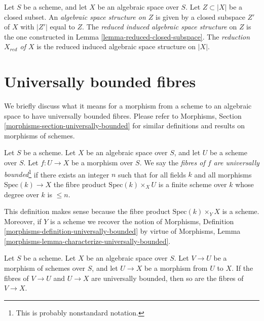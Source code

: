 \begin{definition}
\label{definition-reduced-induced-space}
Let $S$ be a scheme, and let $X$ be an algebraic space over $S$.
Let $Z \subset |X|$ be a closed subset.
An {\it algebraic space structure on $Z$} is given by a closed subspace
$Z'$ of $X$ with $|Z'|$ equal to $Z$.
The {\it reduced induced algebraic space structure}
on $Z$ is the one constructed in
Lemma \ref{lemma-reduced-closed-subspace}.
The {\it reduction $X_{red}$ of $X$} is the reduced induced algebraic
space structure on $|X|$.
\end{definition}






\section{Universally bounded fibres}
\label{section-universally-bounded}

\noindent
We briefly discuss what it means for a morphism from a scheme to an
algebraic space to have universally bounded fibres. Please refer to
Morphisms, Section \ref{morphisms-section-universally-bounded}
for similar definitions and results on morphisms of schemes.

\begin{definition}
\label{definition-universally-bounded}
Let $S$ be a scheme. Let $X$ be an algebraic space over $S$, and
let $U$ be a scheme over $S$. Let $f : U \to X$ be a morphism over $S$.
We say the {\it fibres of $f$ are universally bounded}\footnote{This is
probably nonstandard notation.}
if there exists an integer $n$ such that for all fields
$k$ and all morphisms $\text{Spec}(k) \to X$ the fibre
product $\text{Spec}(k) \times_X U$ is a finite scheme over $k$
whose degree over $k$ is $\leq n$.
\end{definition}

\noindent
This definition makes sense because the fibre product
$\text{Spec}(k) \times_Y X$ is a scheme. Moreover, if $Y$ is a scheme
we recover the notion of
Morphisms, Definition \ref{morphisms-definition-universally-bounded}
by virtue of
Morphisms, Lemma \ref{morphisms-lemma-characterize-universally-bounded}.

\begin{lemma}
\label{lemma-composition-universally-bounded}
Let $S$ be a scheme. Let $X$ be an algebraic space over $S$.
Let $V \to U$ be a morphism of schemes over $S$, and let
$U \to X$ be a morphism from $U$ to $X$. If the fibres of
$V \to U$ and $U \to X$ are universally bounded, then so
are the fibres of $V \to X$.
\end{lemma}

